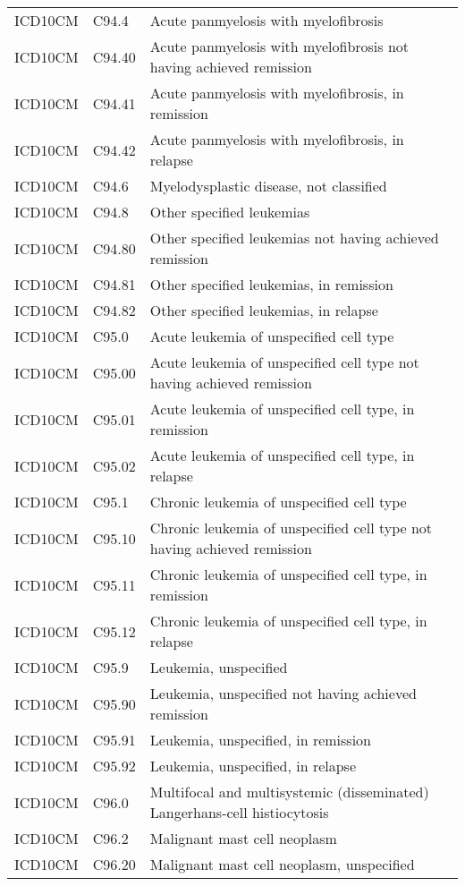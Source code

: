 \begin{table}[ht]
\begin{tabular}{lll}
  ICD10CM & C94.4 & Acute panmyelosis with myelofibrosis \\ 
  ICD10CM & C94.40 & Acute panmyelosis with myelofibrosis not having achieved remission \\ 
  ICD10CM & C94.41 & Acute panmyelosis with myelofibrosis, in remission \\ 
  ICD10CM & C94.42 & Acute panmyelosis with myelofibrosis, in relapse \\ 
  ICD10CM & C94.6 & Myelodysplastic disease, not classified \\ 
  ICD10CM & C94.8 & Other specified leukemias \\ 
  ICD10CM & C94.80 & Other specified leukemias not having achieved remission \\ 
  ICD10CM & C94.81 & Other specified leukemias, in remission \\ 
  ICD10CM & C94.82 & Other specified leukemias, in relapse \\ 
  ICD10CM & C95.0 & Acute leukemia of unspecified cell type \\ 
  ICD10CM & C95.00 & Acute leukemia of unspecified cell type not having achieved remission \\ 
  ICD10CM & C95.01 & Acute leukemia of unspecified cell type, in remission \\ 
  ICD10CM & C95.02 & Acute leukemia of unspecified cell type, in relapse \\ 
  ICD10CM & C95.1 & Chronic leukemia of unspecified cell type \\ 
  ICD10CM & C95.10 & Chronic leukemia of unspecified cell type not having achieved remission \\ 
  ICD10CM & C95.11 & Chronic leukemia of unspecified cell type, in remission \\ 
  ICD10CM & C95.12 & Chronic leukemia of unspecified cell type, in relapse \\ 
  ICD10CM & C95.9 & Leukemia, unspecified \\ 
  ICD10CM & C95.90 & Leukemia, unspecified not having achieved remission \\ 
  ICD10CM & C95.91 & Leukemia, unspecified, in remission \\ 
  ICD10CM & C95.92 & Leukemia, unspecified, in relapse \\ 
  ICD10CM & C96.0 & Multifocal and multisystemic (disseminated) Langerhans-cell histiocytosis \\ 
  ICD10CM & C96.2 & Malignant mast cell neoplasm \\ 
  ICD10CM & C96.20 & Malignant mast cell neoplasm, unspecified \\ 

\end{tabular}
\end{table}
